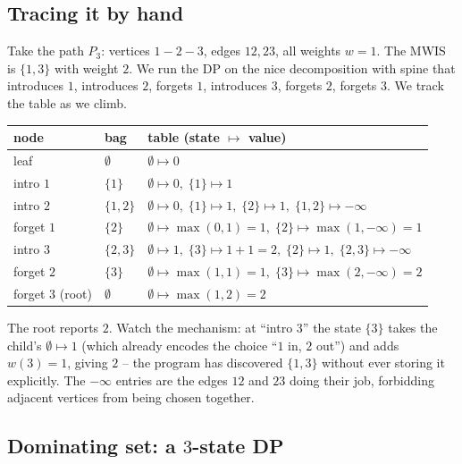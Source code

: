\subsection{Tracing it by hand}

Take the path $P_3$: vertices $1-2-3$, edges $12,23$, all weights $w=1$. The MWIS
is $\{1,3\}$ with weight $2$. We run the DP on the nice decomposition with spine
that introduces $1$, introduces $2$, forgets $1$, introduces $3$, forgets $2$,
forgets $3$. We track the table as we climb.

\begin{center}
\renewcommand{\arraystretch}{1.25}
\begin{tabular}{l l l}
\toprule
node & bag & table (state $\mapsto$ value) \\
\midrule
leaf                & $\emptyset$ & $\emptyset\mapsto 0$ \\
intro $1$           & $\{1\}$     & $\emptyset\mapsto 0,\;\{1\}\mapsto 1$ \\
intro $2$           & $\{1,2\}$   & $\emptyset\mapsto 0,\;\{1\}\mapsto 1,\;\{2\}\mapsto 1,\;\{1,2\}\mapsto -\infty$ \\
forget $1$          & $\{2\}$     & $\emptyset\mapsto \max(0,1)=1,\;\{2\}\mapsto \max(1,-\infty)=1$ \\
intro $3$           & $\{2,3\}$   & $\emptyset\mapsto 1,\;\{3\}\mapsto 1{+}1{=}2,\;\{2\}\mapsto 1,\;\{2,3\}\mapsto -\infty$ \\
forget $2$          & $\{3\}$     & $\emptyset\mapsto \max(1,1)=1,\;\{3\}\mapsto \max(2,-\infty)=2$ \\
forget $3$ (root)   & $\emptyset$ & $\emptyset\mapsto \max(1,2)=2$ \\
\bottomrule
\end{tabular}
\end{center}

The root reports $2$. Watch the mechanism: at ``intro $3$'' the state $\{3\}$
takes the child's $\emptyset\mapsto 1$ (which already encodes the choice ``$1$ in,
$2$ out'') and adds $w(3)=1$, giving $2$ -- the program has discovered $\{1,3\}$
without ever storing it explicitly. The $-\infty$ entries are the edges $12$ and
$23$ doing their job, forbidding adjacent vertices from being chosen together.

\subsection{Dominating set: a $3$-state DP}

